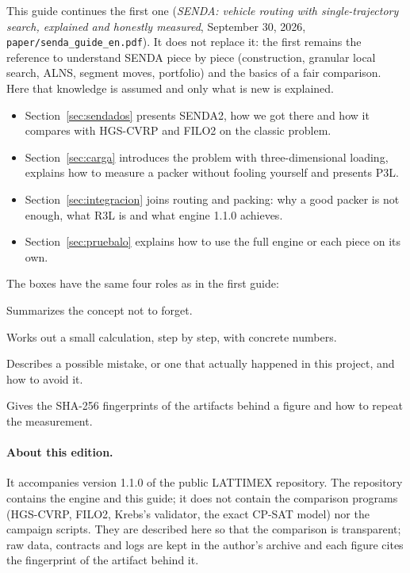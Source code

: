 \documentclass[11pt,a4paper]{article}
\newcommand{\senda}{SENDA}
\newcommand{\sendados}{SENDA2}
\newcommand{\tsl}[1]{\texttt{\small #1}}
\begin{document}
This guide continues the first one (\emph{SENDA: vehicle routing with single-trajectory search,
explained and honestly measured}, September 30, 2026, \tsl{paper/senda\_guide\_en.pdf}). It does not
replace it: the first remains the reference to understand \senda{} piece by piece (construction,
granular local search, ALNS, segment moves, portfolio) and the basics of a fair comparison. Here that
knowledge is assumed and only what is new is explained.

\begin{itemize}[leftmargin=1.5em]
\item Section~\ref{sec:sendados} presents \sendados, how we got there and how it compares with
HGS-CVRP and FILO2 on the classic problem.
\item Section~\ref{sec:carga} introduces the problem with three-dimensional loading, explains how to
measure a packer without fooling yourself and presents P3L.
\item Section~\ref{sec:integracion} joins routing and packing: why a good packer is not enough, what
R3L is and what engine 1.1.0 achieves.
\item Section~\ref{sec:pruebalo} explains how to use the full engine or each piece on its own.
\end{itemize}

The boxes have the same four roles as in the first guide:

\begin{ideaclave}
Summarizes the concept not to forget.
\end{ideaclave}
\begin{ejemplo}
Works out a small calculation, step by step, with concrete numbers.
\end{ejemplo}
\begin{leccion}
Describes a possible mistake, or one that actually happened in this project, and how to avoid it.
\end{leccion}
\begin{reproducir}
Gives the SHA-256 fingerprints of the artifacts behind a figure and how to repeat the measurement.
\end{reproducir}

\paragraph{About this edition.} It accompanies version 1.1.0 of the public LATTIMEX repository. The
repository contains the engine and this guide; it does not contain the comparison programs (HGS-CVRP,
FILO2, Krebs's validator, the exact CP-SAT model) nor the campaign scripts. They are described here so
that the comparison is transparent; raw data, contracts and logs are kept in the author's archive and
each figure cites the fingerprint of the artifact behind it.
\end{document}
